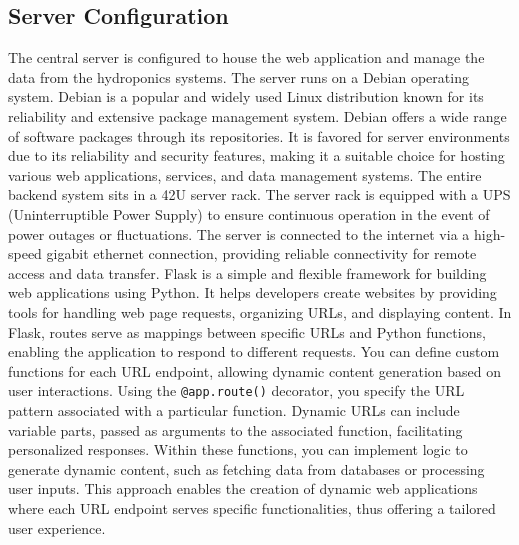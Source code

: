 \documentclass[12pt]{article}
\begin{document}
\subsection{Server Configuration}
\noindent The central server is configured to house the web application and manage the data 
from the hydroponics systems. The server runs on a Debian operating system. Debian is a popular and widely used Linux distribution known for its reliability and extensive package management system. Debian offers a wide range of software packages through its repositories. It is favored for server environments due to its reliability and security features, making it a suitable choice for hosting various web applications, services, and data management systems. The entire backend system sits in a 42U server rack. The server rack is equipped with a UPS (Uninterruptible Power Supply) to ensure continuous operation in the event of power outages or fluctuations. The server is connected to the internet via a high-speed gigabit ethernet connection, providing reliable connectivity for remote access and data transfer.
\newline
\newline
\noindent Flask is a simple and flexible framework for building web applications using Python. It helps developers create websites by providing tools for handling web page requests, organizing URLs, and displaying content. In Flask, routes serve as mappings between specific URLs and Python functions, enabling the application to respond to different requests. You can define custom functions for each URL endpoint, allowing dynamic content generation based on user interactions. Using the \verb|@app.route()| decorator, you specify the URL pattern associated with a particular function. Dynamic URLs can include variable parts, passed as arguments to the associated function, facilitating personalized responses. Within these functions, you can implement logic to generate dynamic content, such as fetching data from databases or processing user inputs. This approach enables the creation of dynamic web applications where each URL endpoint serves specific functionalities, thus offering a tailored user experience.
\newline
\newline
\end{document}
